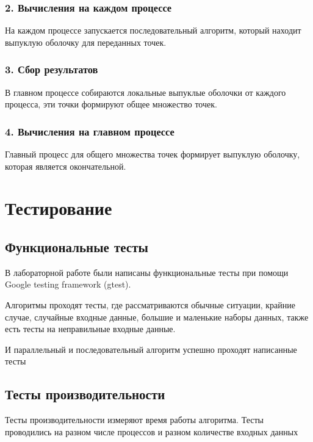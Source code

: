 \documentclass[12pt]{article}
\begin{document}
\subsubsection*{2. Вычисления на каждом процессе}
На каждом процессе запускается последовательный алгоритм, который находит выпуклую оболочку для переданных точек.

\subsubsection*{3. Сбор результатов}
В главном процессе собираются локальные выпуклые оболочки от каждого процесса, эти точки формируют общее множество точек.

\subsubsection*{4. Вычисления на главном процессе}
Главный процесс для общего множества точек формирует выпуклую оболочку, которая является окончательной.

\section{Тестирование}

\subsection*{Функциональные тесты}
В лабораторной работе были написаны функциональные тесты при помощи Google testing framework (gtest).

Алгоритмы проходят тесты, где рассматриваются обычные ситуации, крайние случае, случайные входные данные, большие и маленькие наборы данных, также есть тесты на неправильные входные данные.

И параллельный и последовательный алгоритм успешно проходят написанные тесты

\subsection*{Тесты производительности}

Тесты производительности измеряют время работы алгоритма.
Тесты проводились на разном числе процессов и разном количестве входных данных
\end{document}
